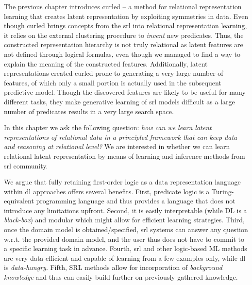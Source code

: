 The previous chapter introduces \gls{curled} -- a method for relational representation learning that creates latent representation by exploiting symmetries in data.
Even though \gls{curled} brings concepts from the \gls{srl} into relational representation learning, it relies on the external clustering procedure to \textit{invent} new predicates.
Thus, the constructed representation hierarchy  is not truly relational as latent features are not defined through logical formulas, even though we managed to find a way to explain the meaning of the constructed features.
Additionally, latent representations created \gls{curled} prone to generating a very large number of features, of which only a small portion  is actually used in the subsequent predictive model.
Though the discovered features are likely to be useful for many different tasks, they make generative learning of \gls{srl} models difficult as a large number of predicates results in a very large search space.





In this chapter we ask the following question: \textit{how can we learn latent representations of relational data in a principled framework that can keep data and reasoning at relational level?}
We are interested in whether we can learn relational latent representation by means of learning and inference methods from \gls{srl} community.



We argue that fully retaining first-order logic as a data representation language within \gls{dl} approaches offers several benefits. 
First, predicate logic is a Turing-equivalent programming language and thus provides a language that does not introduce any limitations upfront. 
Second, it is easily interpretable (while DL is a \textit{black-box}) and modular which might allow for efficient learning strategies.
Third, once the domain model is obtained/specified, \gls{srl} systems can answer any question w.r.t. the provided domain model, and the user thus does not have to commit to a specific learning task in advance. 
Fourth, \gls{srl} and other logic-based ML methods are very data-efficient and capable of learning from a few examples only, while \gls{dl} is \textit{data-hungry}.
Fifth, SRL methods allow for incorporation of \textit{background knowledge} and thus can easily build further on previously gathered knowledge.






